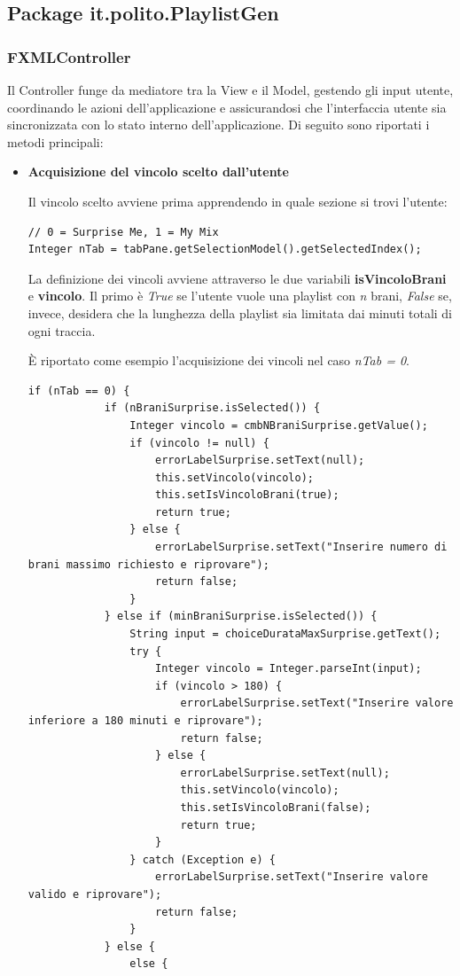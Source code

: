 \documentclass[12pt, a4paper]{article}
\begin{document}
\subsection{Package it.polito.PlaylistGen}

\subsubsection{FXMLController}
Il Controller funge da mediatore tra la View e il Model, gestendo gli input utente, coordinando le azioni dell'applicazione e assicurandosi che l'interfaccia utente sia sincronizzata con lo stato interno dell'applicazione.
Di seguito sono riportati i metodi principali:

\begin{itemize}

\item \textbf{Acquisizione del vincolo scelto dall'utente}

Il vincolo scelto avviene prima apprendendo in quale sezione si trovi l'utente:

\begin{lstlisting}
// 0 = Surprise Me, 1 = My Mix
Integer nTab = tabPane.getSelectionModel().getSelectedIndex(); 
\end{lstlisting}

La definizione dei vincoli avviene attraverso le due variabili \textbf{isVincoloBrani} e \textbf{vincolo}. Il primo è \textit{True} se l'utente vuole una playlist con \textit{n} brani, \textit{False} se, invece, desidera che la lunghezza della playlist sia limitata dai minuti totali di ogni traccia.

È riportato come esempio l'acquisizione dei vincoli nel caso \textit{nTab = 0}.

\begin{lstlisting}
if (nTab == 0) {
			if (nBraniSurprise.isSelected()) {
				Integer vincolo = cmbNBraniSurprise.getValue();
				if (vincolo != null) {
					errorLabelSurprise.setText(null);
					this.setVincolo(vincolo);
					this.setIsVincoloBrani(true);
					return true;
				} else {
					errorLabelSurprise.setText("Inserire numero di brani massimo richiesto e riprovare");
					return false;
				}
			} else if (minBraniSurprise.isSelected()) {
				String input = choiceDurataMaxSurprise.getText();
				try {
					Integer vincolo = Integer.parseInt(input);
					if (vincolo > 180) {
						errorLabelSurprise.setText("Inserire valore inferiore a 180 minuti e riprovare");
						return false;
					} else {
						errorLabelSurprise.setText(null);
						this.setVincolo(vincolo);
						this.setIsVincoloBrani(false);
						return true;
					}
				} catch (Exception e) {
					errorLabelSurprise.setText("Inserire valore valido e riprovare");
					return false;
				}
			} else {
				else {
				

\end{lstlisting}
\end{itemize}
\end{document}
